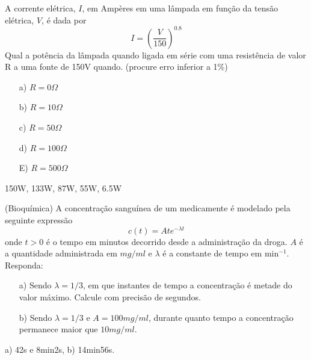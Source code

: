 \documentclass[main.tex]{subfiles}
\begin{document}
\begin{Exercise}[title=Eletricidade]A corrente elétrica, $I$, em Ampères em uma lâmpada em função da tensão elétrica, $V$, é dada por
$$I=\left(\frac{V}{150}\right)^{0.8}$$
Qual a potência da lâmpada quando ligada em série com uma resistência de valor R a uma fonte de 150V quando. (procure erro inferior a 1\%)
\begin{itemize}
\item [a)] $R=0\Omega$
\item [b)] $R=10\Omega$
\item [c)] $R=50\Omega$
\item [d)] $R=100\Omega$
\item [E)] $R=500\Omega$
\end{itemize}
\end{Exercise}
\begin{Answer}
150W, 133W, 87W, 55W, 6.5W
\end{Answer}




\begin{Exercise} (Bioquímica) A concentração sanguínea de um medicamente é modelado pela seguinte expressão
$$c(t)=Ate^{-\lambda t}$$
onde $t>0$ é o tempo em minutos decorrido desde a administração da droga. $A$ é a quantidade administrada em $mg/ml$ e $\lambda$ é a constante de tempo em min$^{-1}$.
Responda:
\begin{itemize}
\item[a)] Sendo $\lambda=1/3$, em que instantes de tempo a concentração é metade do valor máximo. Calcule com precisão de segundos.
\item[b)] Sendo $\lambda=1/3$ e $A=100mg/ml$, durante quanto tempo a concentração permanece maior que $10mg/ml$.
\end{itemize}
\end{Exercise}

\begin{Answer}
a) 42s e 8min2s, b) 14min56s.
\end{Answer}
\end{document}
